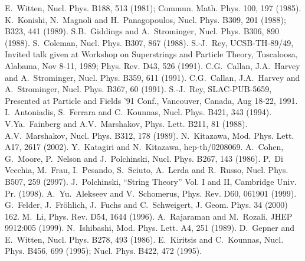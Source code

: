 \documentclass[a4paper,prd,preprint]{revtex4}
\begin{document}
\begin{references}
 E.~Witten, Nucl. Phys. B188, 513 (1981);
 Commun. Math. Phys. 100, 197 (1985).
 K.~Konishi, N.~Magnoli and H.~Panagopoulos,
 Nucl. Phys. B309, 201 (1988); B323, 441 (1989).
 S.B.~Giddings and A.~Strominger, Nucl. Phys. B306, 890 (1988).
 S.~Coleman, Nucl. Phys. B307, 867 (1988).
 S.-J.~Rey, UCSB-TH-89/49,
 Invited talk given at Workshop on Superstrings and Particle Theory,
 Tuscaloosa, Alabama, Nov 8-11, 1989;
 Phys. Rev. D43, 526 (1991).
 C.G.~Callan, J.A.~Harvey and A.~Strominger,
 Nucl. Phys. B359, 611 (1991).
 C.G.~Callan, J.A.~Harvey and A.~Strominger,
 Nucl. Phys. B367, 60 (1991).
 S.-J.~Rey, SLAC-PUB-5659,
 Presented at Particle and Fields '91 Conf.,
 Vancouver, Canada, Aug 18-22, 1991.
 I.~Antoniadis, S.~Ferrara and C.~Kounnas,
 Nucl. Phys. B421, 343 (1994).
 V.Ya.~Fainberg and A.V.~Marshakov, Phys. Lett. B211, 81 (1988).
 A.V.~Marshakov, Nucl. Phys. B312, 178 (1989).
 N.~Kitazawa, Mod. Phys. Lett. A17, 2617 (2002).
 Y.~Katagiri and N.~Kitazawa, hep-th/0208069.
 A.~Cohen, G.~Moore, P.~Nelson and J.~Polchinski,
 Nucl. Phys. B267, 143 (1986).
 P.~Di Vecchia, M.~Frau, I.~Pesando, S.~Sciuto, A.~Lerda and R.~Russo,
 Nucl. Phys. B507, 259 (2997).
 J.~Polchinski, ``String Theory'' Vol. I and II,
 Cambridge Univ. Pr. (1998).
 A.~Yu.~Alekseev and V.~Schomerus, Phys. Rev. D60, 061901 (1999).
 G.~Felder, J.~Fr\"ohlich, J.~Fuchs and C.~Schweigert,
 J. Geom. Phys. 34 (2000) 162.
 M.~Li, Phys. Rev. D54, 1644 (1996).
 A.~Rajaraman and M.~Rozali, JHEP 9912:005 (1999).
 N.~Ishibashi, Mod. Phys. Lett. A4, 251 (1989).
 D.~Gepner and E.~Witten, Nucl. Phys. B278, 493 (1986).
 E.~Kiritsis and C.~Kounnas,
 Nucl. Phys. B456, 699 (1995); Nucl. Phys. B422, 472 (1995).
\end{references}
\end{document}
